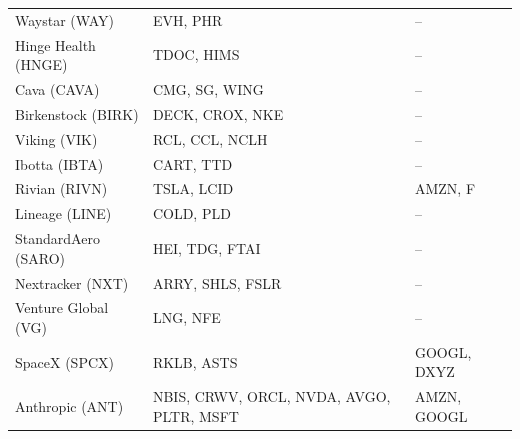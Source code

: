 {\begin{longtable}{lll}
Waystar (WAY) & EVH, PHR & -- \\
Hinge Health (HNGE) & TDOC, HIMS & -- \\
Cava (CAVA) & CMG, SG, WING & -- \\
Birkenstock (BIRK) & DECK, CROX, NKE & -- \\
Viking (VIK) & RCL, CCL, NCLH & -- \\
Ibotta (IBTA) & CART, TTD & -- \\
Rivian (RIVN) & TSLA, LCID & AMZN, F \\
Lineage (LINE) & COLD, PLD & -- \\
StandardAero (SARO) & HEI, TDG, FTAI & -- \\
Nextracker (NXT) & ARRY, SHLS, FSLR & -- \\
Venture Global (VG) & LNG, NFE & -- \\
SpaceX (SPCX) & RKLB, ASTS & GOOGL, DXYZ \\
Anthropic (ANT) & NBIS, CRWV, ORCL, NVDA, AVGO, PLTR, MSFT & AMZN, GOOGL \\
\bottomrule
\end{longtable}}
